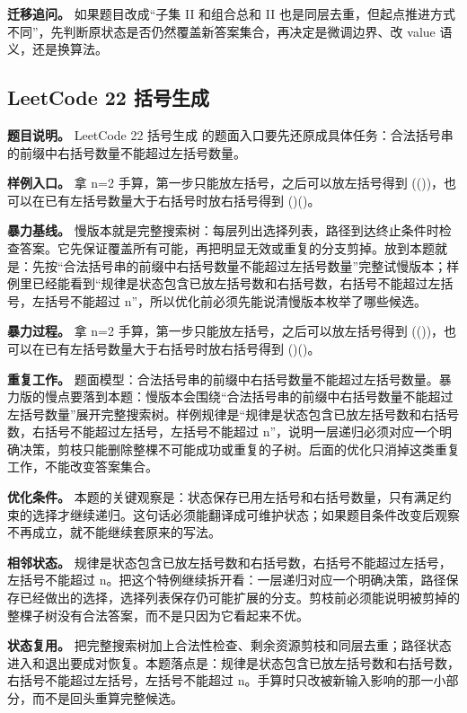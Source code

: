 \textbf{迁移追问。} 如果题目改成“子集 II 和组合总和 II 也是同层去重，但起点推进方式不同”，先判断原状态是否仍然覆盖新答案集合，再决定是微调边界、改 value 语义，还是换算法。

\subsection{LeetCode 22 括号生成}

\textbf{题目说明。} LeetCode 22 括号生成 的题面入口要先还原成具体任务：合法括号串的前缀中右括号数量不能超过左括号数量。

\textbf{样例入口。} 拿 n=2 手算，第一步只能放左括号，之后可以放左括号得到 (())，也可以在已有左括号数量大于右括号时放右括号得到 ()()。

\textbf{暴力基线。} 慢版本就是完整搜索树：每层列出选择列表，路径到达终止条件时检查答案。它先保证覆盖所有可能，再把明显无效或重复的分支剪掉。放到本题就是：先按“合法括号串的前缀中右括号数量不能超过左括号数量”完整试慢版本；样例里已经能看到“规律是状态包含已放左括号数和右括号数，右括号不能超过左括号，左括号不能超过 n”，所以优化前必须先能说清慢版本枚举了哪些候选。

\textbf{暴力过程。} 拿 n=2 手算，第一步只能放左括号，之后可以放左括号得到 (())，也可以在已有左括号数量大于右括号时放右括号得到 ()()。

\textbf{重复工作。} 题面模型：合法括号串的前缀中右括号数量不能超过左括号数量。暴力版的慢点要落到本题：慢版本会围绕“合法括号串的前缀中右括号数量不能超过左括号数量”展开完整搜索树。样例规律是“规律是状态包含已放左括号数和右括号数，右括号不能超过左括号，左括号不能超过 n”，说明一层递归必须对应一个明确决策，剪枝只能删除整棵不可能成功或重复的子树。后面的优化只消掉这类重复工作，不能改变答案集合。

\textbf{优化条件。} 本题的关键观察是：状态保存已用左括号和右括号数量，只有满足约束的选择才继续递归。这句话必须能翻译成可维护状态；如果题目条件改变后观察不再成立，就不能继续套原来的写法。

\textbf{相邻状态。} 规律是状态包含已放左括号数和右括号数，右括号不能超过左括号，左括号不能超过 n。把这个特例继续拆开看：一层递归对应一个明确决策，路径保存已经做出的选择，选择列表保存仍可能扩展的分支。剪枝前必须能说明被剪掉的整棵子树没有合法答案，而不是只因为它看起来不优。

\textbf{状态复用。} 把完整搜索树加上合法性检查、剩余资源剪枝和同层去重；路径状态进入和退出要成对恢复。本题落点是：规律是状态包含已放左括号数和右括号数，右括号不能超过左括号，左括号不能超过 n。手算时只改被新输入影响的那一小部分，而不是回头重算完整候选。

